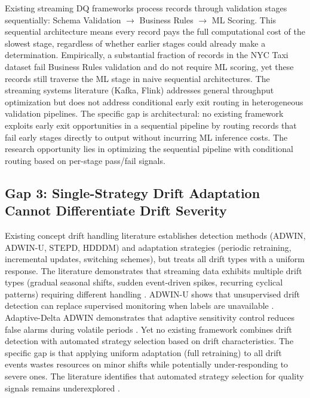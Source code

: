 Existing streaming DQ frameworks process records through validation stages sequentially: Schema Validation $\rightarrow$ Business Rules $\rightarrow$ ML Scoring. This sequential architecture means every record pays the full computational cost of the slowest stage, regardless of whether earlier stages could already make a determination. Empirically, a substantial fraction of records in the NYC Taxi dataset fail Business Rules validation and do not require ML scoring, yet these records still traverse the ML stage in naive sequential architectures. The streaming systems literature (Kafka, Flink) addresses general throughput optimization but does not address conditional early exit routing in heterogeneous validation pipelines. The specific gap is architectural: no existing framework exploits early exit opportunities in a sequential pipeline by routing records that fail early stages directly to output without incurring ML inference costs. The research opportunity lies in optimizing the sequential pipeline with conditional routing based on per-stage pass/fail signals.

\subsection{Gap 3: Single-Strategy Drift Adaptation Cannot Differentiate Drift Severity}

Existing concept drift handling literature establishes detection methods (ADWIN, ADWIN-U, STEPD, HDDDM) and adaptation strategies (periodic retraining, incremental updates, switching schemes), but treats all drift types with a uniform response. The literature demonstrates that streaming data exhibits multiple drift types (gradual seasonal shifts, sudden event-driven spikes, recurring cyclical patterns) requiring different handling \citep{baier2020switching}. ADWIN-U shows that unsupervised drift detection can replace supervised monitoring when labels are unavailable \citep{adwinu2025}. Adaptive-Delta ADWIN demonstrates that adaptive sensitivity control reduces false alarms during volatile periods \citep{adt2025}. Yet no existing framework combines drift detection with automated strategy selection based on drift characteristics. The specific gap is that applying uniform adaptation (full retraining) to all drift events wastes resources on minor shifts while potentially under-responding to severe ones. The literature identifies that automated strategy selection for quality signals remains underexplored \citep{contextdq2022}.

